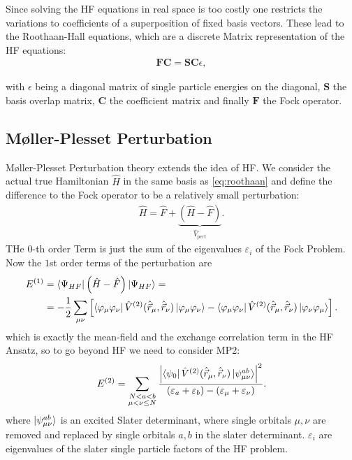 Since solving the \ac{HF} equations in real space is too costly one restricts the variations to coefficients of a superposition of fixed basis vectors. These lead to the Roothaan-Hall equations, which are a discrete Matrix representation of the \ac{HF} equations:
\begin{align}
	\mathbf{F C}=\mathbf{S C} \epsilon,
	\label{eq:roothaan}
\end{align} 

with $\epsilon$ being a diagonal matrix of single particle energies on the diagonal, $\mathbf{S}$ the basis overlap matrix, $\mathbf{C}$ the coefficient matrix and finally $\mathbf{F}$ the Fock operator.
\subsection{Møller-Plesset Perturbation}
Møller-Plesset Perturbation theory extends the idea of \ac{HF}. We consider the actual true Hamiltonian  $\hat{H}$ in the same basis as \ref{eq:roothaan} and define the difference to the Fock operator to be a relatively small perturbation:
\begin{align}
	\hat{H}= \hat{F} + \underbrace{\left(\hat{H}-\hat{F}\right)}_{\hat{V}_{pert}}.
\end{align} THe $0$-th order Term is just the sum of the eigenvalues $\varepsilon_i$ of the Fock Problem.
Now the $1$st order terms of the perturbation are
\begin{align}
	E^{(1)}&=\bra{\Psi_{HF}}\left(\hat{H}-\hat{F}\right)\ket{\Psi_{HF}}=\\
	&=-\frac{1}{2}\sum_{\mu\nu}\left[\bra{\varphi_{\mu}\varphi_{\nu}}\hat{V}^{(2)}(\hat{\vec{r}}_\mu,\hat{\vec{r}}_\nu)\ket{\varphi_{\mu}\varphi_{\nu}}-\bra{\varphi_{\mu}\varphi_{\nu}}\hat{V}^{(2)}(\hat{\vec{r}}_\mu,\hat{\vec{r}}_\nu)\ket{\varphi_{\nu}\varphi_{\mu}}\right].
\end{align} 
which is exactly the mean-field and the exchange correlation term in the \ac{HF} Ansatz, so to go beyond \ac{HF} we need to consider \ac{MP2}:
\begin{align}
	E^{(2)}=\sum_{\substack{N<a<b \\ \mu<\nu \leq N}} \frac{\left|\bra{\psi_0}\hat{V}^{(2)}(\hat{\vec{r}}_\mu,\hat{\vec{r}}_\nu)\ket{\psi_{\mu\nu}^{a b}}\right|^ 2}{\left(\varepsilon_a+\varepsilon_b\right)-\left(\varepsilon_\mu+\varepsilon_\nu\right)} .
\end{align} where $\ket{\psi_{\mu\nu}^{a b}}$ is an excited Slater determinant, where single orbitals $\mu, \nu$ are removed and replaced by single orbitals $a,b$ in the slater determinant. $\varepsilon_i$ are eigenvalues of the slater single particle factors of the \ac{HF} problem.
